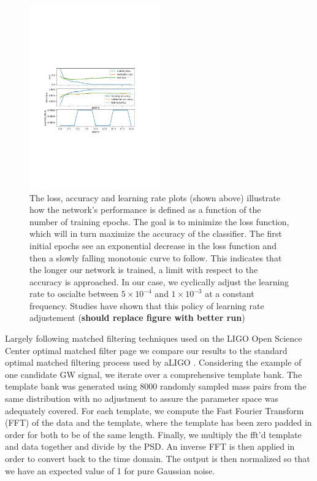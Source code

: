 \documentclass[%
 amsmath,amssymb,
 aps,
 twocolumn,
 prl,
 reprint,
floatfix,
]{revtex4-1}
\begin{document}
\begin{figure}[!h] 
\includegraphics[width=0.5\textwidth]{figures/loss.pdf}
\caption{\label{fig:loss_curve} The loss, accuracy and learning rate plots
(shown above) illustrate how the network's performance is defined as a function
of the number of training epochs. The goal is to minimize the loss function,
which will in turn maximize the accuracy of the classifier. The first initial
epochs see an exponential decrease in the loss function and then a slowly
falling monotonic curve to follow. This indicates that the longer our network
is trained, a limit with respect to the accuracy is approached. In our case, we
cyclically adjust the learning rate to oscialte between $5 \times 10^{-4}$ and
$1 \times 10^{-3}$ at a constant frequency. Studies have shown that this policy
of learning rate adjustement (\textbf{should replace figure with better run})}
\end{figure}

Largely following matched filtering techniques used on the LIGO Open Science
Center optimal matched filter page \cite{1742-6596-610-1-012021} we compare our
results to the standard optimal matched filtering process used by aLIGO
\cite{PhysRevD.85.122006}. Considering the example of one candidate GW signal,
we iterate over a comprehensive template bank. The template bank was generated
using 8000 randomly sampled mass pairs from the same distribution with no
adjustment to assure the parameter space was adequately covered. For each
template, we compute the Fast Fourier Transform (FFT) of the data and the
template, where the template has been zero padded in order for both to be of
the same length. Finally, we multiply the fft'd template and data together and
divide by the PSD. An inverse FFT is then applied in order to convert back to
the time domain. The output is then normalized so that we have an expected
value of 1 for pure Gaussian noise.
\end{document}

